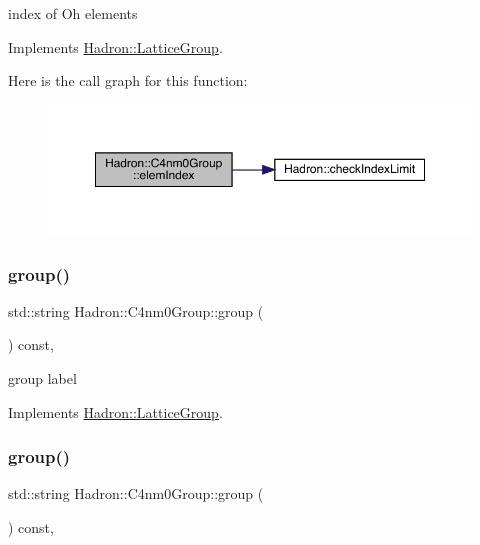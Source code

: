 index of Oh elements 

Implements \mbox{\hyperlink{structHadron_1_1LatticeGroup_afb8e3ee60de059f75bce1044c694e1e8}{Hadron\+::\+Lattice\+Group}}.

Here is the call graph for this function\+:
\nopagebreak
\begin{figure}[H]
\begin{center}
\leavevmode
\includegraphics[width=350pt]{da/da1/structHadron_1_1C4nm0Group_a700a48f1865a634b774127d8710e1ecc_cgraph}
\end{center}
\end{figure}
\mbox{\label{structHadron_1_1C4nm0Group_a2a84060776245ed0045a7271b00064eb}} 
\subsubsection{\texorpdfstring{group()}{group()}\hspace{0.1cm}{\footnotesize\ttfamily [1/2]}}
{\footnotesize\ttfamily std\+::string Hadron\+::\+C4nm0\+Group\+::group (\begin{DoxyParamCaption}{ }\end{DoxyParamCaption}) const\hspace{0.3cm}{\ttfamily [inline]}, {\ttfamily [virtual]}}

group label 

Implements \mbox{\hyperlink{structHadron_1_1LatticeGroup_a82208a322bf1b1db489f16af38e70087}{Hadron\+::\+Lattice\+Group}}.

\mbox{\label{structHadron_1_1C4nm0Group_a2a84060776245ed0045a7271b00064eb}} 
\subsubsection{\texorpdfstring{group()}{group()}\hspace{0.1cm}{\footnotesize\ttfamily [2/2]}}
{\footnotesize\ttfamily std\+::string Hadron\+::\+C4nm0\+Group\+::group (\begin{DoxyParamCaption}{ }\end{DoxyParamCaption}) const\hspace{0.3cm}{\ttfamily [inline]}, {\ttfamily [virtual]}}

